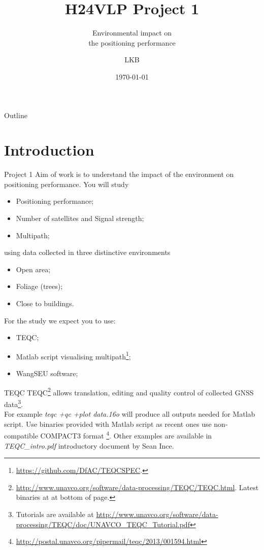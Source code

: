 \documentclass[11pt]{beamer}
\title[H24VLP]{H24VLP Project 1}
\subtitle{Environmental impact on \\the positioning performance}
\author{LKB}
\institute{NGI}
\date{\today}
\newcommand{\MatlabRef}{\footnote{\url{https://github.com/DfAC/TEQCSPEC}.}}
\begin{document}
	
	\begin{frame}
		\titlepage
	\end{frame}
	
	\begin{frame}{Outline}
		\tableofcontents
	\end{frame}
	
\section{Introduction}

	\begin{frame}[allowframebreaks]{Project 1}
		Aim of work is to understand the impact of the environment on positioning performance. You will study 
		\begin{itemize}
			\item Positioning performance;
			\item Number of satellites and Signal strength;
			\item Multipath;
		\end{itemize}
		using data collected in three distinctive environments
		\begin{itemize}
			\item Open area;
			\item Foliage (trees);
			\item Close to buildings.
		\end{itemize}
		For the study we expect you to use:
		\begin{itemize}
			\item TEQC;
			\item Matlab script visualising multipath\MatlabRef;
			\item WangSEU software;
		\end{itemize}

	\end{frame}


	\begin{frame}{TEQC}
		TEQC\footnote{\url{http://www.unavco.org/software/data-processing/TEQC/TEQC.html}. Latest binaries at at bottom of page.} allows translation, editing and quality control of collected GNSS data\footnote{Tutorials are available at \url{http://www.unavco.org/software/data-processing/TEQC/doc/UNAVCO_TEQC_Tutorial.pdf}}. \\
		\medskip
		For example \alert{\textit{ teqc +qc +plot data.16o}} will produce all outputs needed for Matlab script. Use binaries provided with Matlab script as recent ones use non-compatible COMPACT3 format \footnote{\url{http://postal.unavco.org/pipermail/teqc/2013/001594.html}}. Other examples are available in \textit{TEQC\_intro.pdf} introductory document by Sean Ince.

	\end{frame}
\end{document}
